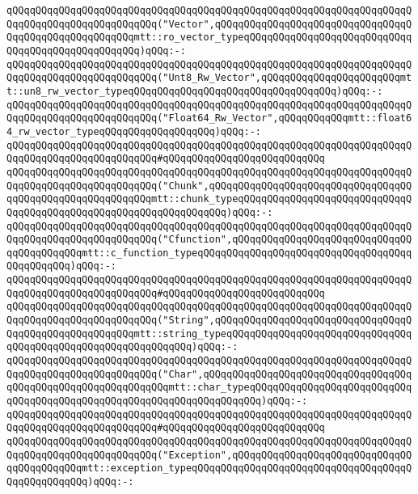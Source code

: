 \verb|qQQqqQQqqQQqqQQqqQQqqQQqqQQqqQQqqQQqqQQqqQQqqQQqqQQqqQQqqQQqqQQqqQQqqQQqqQQqqQQqqQQqqQQqqQQqqQQq("Vector",qQQqqQQqqQQqqQQqqQQqqQQqqQQqqQQqqQQqqQQqqQQqqQQqqQQqqQQqmtt::ro_vector_typeqQQqqQQqqQQqqQQqqQQqqQQqqQQqqQQqqQQqqQQqqQQqqQQqqQQq)qQQq:-:|\newline
\verb|qQQqqQQqqQQqqQQqqQQqqQQqqQQqqQQqqQQqqQQqqQQqqQQqqQQqqQQqqQQqqQQqqQQqqQQqqQQqqQQqqQQqqQQqqQQqqQQq("Unt8_Rw_Vector",qQQqqQQqqQQqqQQqqQQqqQQqmtt::un8_rw_vector_typeqQQqqQQqqQQqqQQqqQQqqQQqqQQqqQQqqQQq)qQQq:-:|\newline
\verb|qQQqqQQqqQQqqQQqqQQqqQQqqQQqqQQqqQQqqQQqqQQqqQQqqQQqqQQqqQQqqQQqqQQqqQQqqQQqqQQqqQQqqQQqqQQqqQQq("Float64_Rw_Vector",qQQqqQQqqQQqmtt::float64_rw_vector_typeqQQqqQQqqQQqqQQqqQQq)qQQq:-:|\newline
\verb|qQQqqQQqqQQqqQQqqQQqqQQqqQQqqQQqqQQqqQQqqQQqqQQqqQQqqQQqqQQqqQQqqQQqqQQqqQQqqQQqqQQqqQQqqQQqqQQq#qQQqqQQqqQQqqQQqqQQqqQQqqQQq|\newline
\verb|qQQqqQQqqQQqqQQqqQQqqQQqqQQqqQQqqQQqqQQqqQQqqQQqqQQqqQQqqQQqqQQqqQQqqQQqqQQqqQQqqQQqqQQqqQQqqQQq("Chunk",qQQqqQQqqQQqqQQqqQQqqQQqqQQqqQQqqQQqqQQqqQQqqQQqqQQqqQQqqQQqmtt::chunk_typeqQQqqQQqqQQqqQQqqQQqqQQqqQQqqQQqqQQqqQQqqQQqqQQqqQQqqQQqqQQqqQQqqQQq)qQQq:-:|\newline
\verb|qQQqqQQqqQQqqQQqqQQqqQQqqQQqqQQqqQQqqQQqqQQqqQQqqQQqqQQqqQQqqQQqqQQqqQQqqQQqqQQqqQQqqQQqqQQqqQQq("Cfunction",qQQqqQQqqQQqqQQqqQQqqQQqqQQqqQQqqQQqqQQqqQQqmtt::c_function_typeqQQqqQQqqQQqqQQqqQQqqQQqqQQqqQQqqQQqqQQqqQQqqQQq)qQQq:-:|\newline
\verb|qQQqqQQqqQQqqQQqqQQqqQQqqQQqqQQqqQQqqQQqqQQqqQQqqQQqqQQqqQQqqQQqqQQqqQQqqQQqqQQqqQQqqQQqqQQqqQQq#qQQqqQQqqQQqqQQqqQQqqQQqqQQq|\newline
\verb|qQQqqQQqqQQqqQQqqQQqqQQqqQQqqQQqqQQqqQQqqQQqqQQqqQQqqQQqqQQqqQQqqQQqqQQqqQQqqQQqqQQqqQQqqQQqqQQq("String",qQQqqQQqqQQqqQQqqQQqqQQqqQQqqQQqqQQqqQQqqQQqqQQqqQQqqQQqmtt::string_typeqQQqqQQqqQQqqQQqqQQqqQQqqQQqqQQqqQQqqQQqqQQqqQQqqQQqqQQqqQQqqQQq)qQQq:-:|\newline
\verb|qQQqqQQqqQQqqQQqqQQqqQQqqQQqqQQqqQQqqQQqqQQqqQQqqQQqqQQqqQQqqQQqqQQqqQQqqQQqqQQqqQQqqQQqqQQqqQQq("Char",qQQqqQQqqQQqqQQqqQQqqQQqqQQqqQQqqQQqqQQqqQQqqQQqqQQqqQQqqQQqqQQqmtt::char_typeqQQqqQQqqQQqqQQqqQQqqQQqqQQqqQQqqQQqqQQqqQQqqQQqqQQqqQQqqQQqqQQqqQQqqQQq)qQQq:-:|\newline
\verb|qQQqqQQqqQQqqQQqqQQqqQQqqQQqqQQqqQQqqQQqqQQqqQQqqQQqqQQqqQQqqQQqqQQqqQQqqQQqqQQqqQQqqQQqqQQqqQQq#qQQqqQQqqQQqqQQqqQQqqQQqqQQq|\newline
\verb|qQQqqQQqqQQqqQQqqQQqqQQqqQQqqQQqqQQqqQQqqQQqqQQqqQQqqQQqqQQqqQQqqQQqqQQqqQQqqQQqqQQqqQQqqQQqqQQq("Exception",qQQqqQQqqQQqqQQqqQQqqQQqqQQqqQQqqQQqqQQqqQQqmtt::exception_typeqQQqqQQqqQQqqQQqqQQqqQQqqQQqqQQqqQQqqQQqqQQqqQQqqQQq)qQQq:-:|\newline
